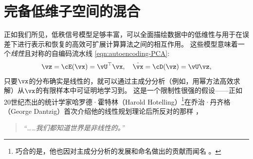 \documentclass[../../book-main.tex]{subfiles}
\begin{document}
\section{完备低维子空间的混合}%
\label{sec:ica}
正如我们所见，低秩信号模型足够丰富，可以全面描绘数据中的低维性与用于在误差下进行表示和恢复的高效可扩展计算算法之间的相互作用。
这些模型意味着一个\textit{线性}且对称的自编码流水线 \eqref{eqn:autoencoding-PCA}: 
\begin{equation*}
    \vz = \cE(\vx) = \vU^\top \vx, \quad \hat{\vx} = \cD(\vz) = \vU \vz,
\end{equation*}
只要$\vx$的分布确实是线性的，就可以通过主成分分析（例如，用幂方法高效求解）从$\vx$的有限样本中可证明地学习到。
这是一个限制性很强的假设——正如20世纪杰出的统计学家哈罗德·霍特林（Harold Hotelling）\footnote{巧合的是，他也因对主成分分析的发展和命名做出的贡献而闻名 \cite{Hotelling1933}。}在乔治·丹齐格（George Dantzig）首次介绍他的线性规划理论后所反对的那样 \cite{Dantzig2002-eh}，
\begin{quote}
\centering
    \textit{“……我们都知道世界是非线性的。”}
\end{quote}
\end{document}
